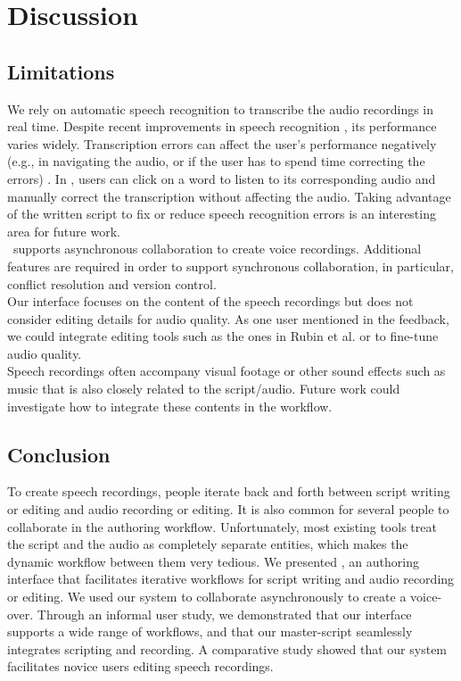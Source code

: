 \section{Discussion}
\subsection{Limitations}
We rely on automatic speech recognition to transcribe the audio recordings in real time. Despite recent improvements in speech recognition \cite{hinton2012deep}, its performance varies widely. Transcription errors can affect the user's performance negatively (e.g., in navigating the audio, or if the user has to spend time correcting the errors) \cite{gaur2015effects}. In \voicescript , users can click on a word to listen to its corresponding audio and manually correct the transcription without affecting the audio. Taking advantage of the written script to fix or reduce speech recognition errors is an interesting area for future work.\\

\voicescript\ supports asynchronous collaboration to create voice recordings. Additional features are required in order to support synchronous collaboration, in particular, conflict resolution and version control.\\ 

Our interface focuses on the content of the speech recordings but does not consider editing details for audio quality. As one user mentioned in the feedback, we could integrate editing tools such as the ones in Rubin et al. \cite{rubin2013content} or \cite{rubin2015capture} to fine-tune audio quality. \\

Speech recordings often accompany visual footage or other sound effects such as music that is also closely related to the script/audio. Future work could investigate how to integrate these contents in the workflow.

\subsection{Conclusion}
To create speech recordings, people iterate back and forth between script writing or editing and audio recording or editing.  It is also common for several people to collaborate in the authoring workflow. Unfortunately, most existing tools treat the script and the audio as completely separate entities, which makes the dynamic workflow between them very tedious. We presented \voicescript , an authoring interface that facilitates iterative workflows for script writing and audio recording or editing. We used our system to collaborate asynchronously to create a voice-over. Through an informal user study, we demonstrated that our interface supports a wide range of workflows, and that our master-script seamlessly integrates scripting and recording. A comparative study showed that our system facilitates novice users editing speech recordings. 


